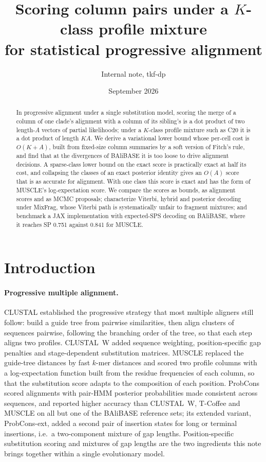 \documentclass[11pt]{article}
\title{Scoring column pairs under a $K$-class profile mixture\\
for statistical progressive alignment}
\author{Internal note, tkf-dp}
\date{September 2026}
\begin{document}
\maketitle

\begin{abstract}
In progressive alignment under a single substitution model, scoring the merge
of a column of one clade's alignment with a column of its sibling's is a dot
product of two length-$A$ vectors of partial likelihoods; under a $K$-class
profile mixture such as C20 it is a dot product of length $KA$. We derive a
variational lower bound whose per-cell cost is $O(K+A)$, built from fixed-size
column summaries by a soft version of Fitch's rule, and find that at the
divergences of BAliBASE it is too loose to drive alignment decisions. A
sparse-class lower bound on the exact score is practically exact at half its
cost, and collapsing the classes of an exact posterior identity gives an $O(A)$
score that is as accurate for alignment. With one class this score is exact
and has the form of MUSCLE's log-expectation score. We compare the scores as
bounds, as alignment scores and as MCMC proposals; characterize Viterbi,
hybrid and posterior decoding under MixFrag, whose Viterbi path is
systematically unfair to fragment mixtures; and benchmark a JAX implementation
with expected-SPS decoding on BAliBASE, where it reaches SP 0.751 against 0.841
for MUSCLE.
\end{abstract}

\section{Introduction}
\label{sec:intro}

\paragraph{Progressive multiple alignment.} CLUSTAL \citep{HigginsSharp1988}
established the progressive strategy that most multiple aligners still
follow: build a guide tree from pairwise similarities, then align clusters of
sequences pairwise, following the branching order of the tree, so that each
step aligns two profiles. CLUSTAL~W \citep{Thompson1994} added sequence
weighting, position-specific gap penalties and stage-dependent substitution
matrices. MUSCLE \citep{Edgar2004} replaced the guide-tree distances by fast
$k$-mer distances and scored two profile columns with a log-expectation
function built from the residue frequencies of each column, so that the
substitution score adapts to the composition of each position. ProbCons
\citep{Do2005} scored alignments with pair-HMM posterior probabilities made
consistent across sequences, and reported higher accuracy than CLUSTAL~W,
T-Coffee and MUSCLE on all but one of the BAliBASE reference sets; its extended variant, ProbCons-ext, added a
second pair of insertion states for long or terminal insertions, i.e.\ a
two-component mixture of gap lengths. Position-specific substitution scoring
and mixtures of gap lengths are the two ingredients this note brings together
within a single evolutionary model.
\end{document}
